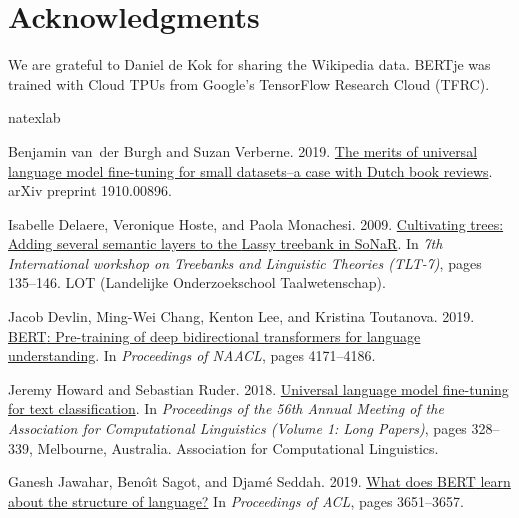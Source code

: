 \documentclass[11pt]{article}
\begin{document}
\section*{Acknowledgments}
We are grateful to Daniel de Kok for sharing the Wikipedia data. 
BERTje was trained with Cloud TPUs from Google's TensorFlow Research Cloud (TFRC).


\begin{thebibliography}{21}
\expandafter\ifx\csname natexlab\endcsname\relax\def\natexlab#1{#1}\fi

Benjamin van~der Burgh and Suzan Verberne. 2019.
\newblock \href {https://arxiv.org/abs/1910.00896} {The merits of universal
  language model fine-tuning for small datasets--a case with {Dutch} book
  reviews}.
\newblock arXiv preprint 1910.00896.

Isabelle Delaere, Veronique Hoste, and Paola Monachesi. 2009.
\newblock \href {https://biblio.ugent.be/publication/906455/file/4264130}
  {Cultivating trees: Adding several semantic layers to the {Lassy} treebank in
  {SoNaR}}.
\newblock In \emph{7th International workshop on Treebanks and Linguistic
  Theories (TLT-7)}, pages 135--146. LOT (Landelijke Onderzoekschool
  Taalwetenschap).

Jacob Devlin, Ming-Wei Chang, Kenton Lee, and Kristina Toutanova. 2019.
\newblock \href {https://doi.org/10.18653/v1/N19-1423} {{BERT}: Pre-training of
  deep bidirectional transformers for language understanding}.
\newblock In \emph{Proceedings of NAACL}, pages 4171--4186.

Jeremy Howard and Sebastian Ruder. 2018.
\newblock \href {http://www.aclweb.org/anthology/P18-1031} {Universal language
  model fine-tuning for text classification}.
\newblock In \emph{Proceedings of the 56th Annual Meeting of the Association
  for Computational Linguistics (Volume 1: Long Papers)}, pages 328--339,
  Melbourne, Australia. Association for Computational Linguistics.

Ganesh Jawahar, Beno{\^\i}t Sagot, and Djam{\'e} Seddah. 2019.
\newblock \href {https://doi.org/10.18653/v1/P19-1356} {What does {BERT} learn
  about the structure of language?}
\newblock In \emph{Proceedings of ACL}, pages 3651--3657.


\end{thebibliography}
\end{document}
